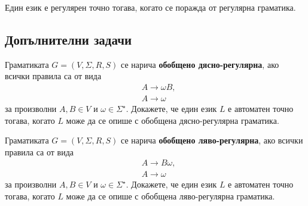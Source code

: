 \begin{framed}
  \begin{theorem}
    Един език е регулярен точно тогава, когато се поражда от регулярна граматика.
  \end{theorem}
\end{framed}

\subsection{Допълнителни задачи}

\begin{extra}

\begin{problem}
  Граматиката $G = (V, \Sigma, R, S)$ се нарича {\bf обобщено дясно-регулярна},
  ако всички правила са от вида 
  \begin{align*}
    & A \to \omega B,\\
    & A \to \omega
  \end{align*}
  за произволни $A, B \in V$ и $\omega \in \Sigma^\star$.
  Докажете, че един език $L$ е автоматен точно тогава, когато $L$ може да се опише с обобщена дясно-регулярна граматика.
\end{problem}

\begin{problem}
  Граматиката $G = (V, \Sigma, R, S)$ се нарича {\bf обобщено ляво-регулярна},
  ако всички правила са от вида 
  \begin{align*}
    & A \to B\omega,\\
    & A \to \omega
  \end{align*}
  за произволни $A, B \in V$ и $\omega \in \Sigma^\star$.
  Докажете, че един език $L$ е автоматен точно тогава, когато $L$ може да се опише с обобщена ляво-регулярна граматика.
\end{problem}

\end{extra}

